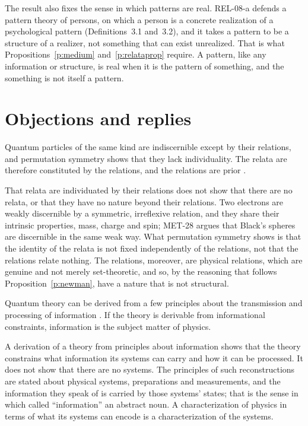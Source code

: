 \documentclass{situationist-preprint}
\begin{document}
The result also fixes the sense in which patterns are real. REL-08-a defends a pattern theory of persons, on which a person is a concrete realization of a psychological pattern (Definitions~3.1 and~3.2), and it takes a pattern to be a structure of a realizer, not something that can exist unrealized. That is what Propositions~\ref{p:medium} and~\ref{p:relataprop} require. A pattern, like any information or structure, is real when it is the pattern of something, and the something is not itself a pattern.

\section{Objections and replies}\label{s:objections}

\begin{objection}\label{o:ofirst}
Quantum particles of the same kind are indiscernible except by their relations, and permutation symmetry shows that they lack individuality. The relata are therefore constituted by the relations, and the relations are prior \citep{LadymanRoss2007,French2014}.
\end{objection}

\begin{reply}
That relata are individuated by their relations does not show that there are no relata, or that they have no nature beyond their relations. Two electrons are weakly discernible by a symmetric, irreflexive relation, and they share their intrinsic properties, mass, charge and spin; MET-28 argues that Black's spheres are discernible in the same weak way. What permutation symmetry shows is that the identity of the relata is not fixed independently of the relations, not that the relations relate nothing. The relations, moreover, are physical relations, which are genuine and not merely set-theoretic, and so, by the reasoning that follows Proposition~\ref{p:newman}, have a nature that is not structural.
\end{reply}

\begin{objection}\label{o:recon}
Quantum theory can be derived from a few principles about the transmission and processing of information \citep{CliftonBubHalvorson2003}. If the theory is derivable from informational constraints, information is the subject matter of physics.
\end{objection}

\begin{reply}
A derivation of a theory from principles about information shows that the theory constrains what information its systems can carry and how it can be processed. It does not show that there are no systems. The principles of such reconstructions are stated about physical systems, preparations and measurements, and the information they speak of is carried by those systems' states; that is the sense in which \citet{Timpson2013} called \enquote{information} an abstract noun. A characterization of physics in terms of what its systems can encode is a characterization of the systems.
\end{reply}
\end{document}
